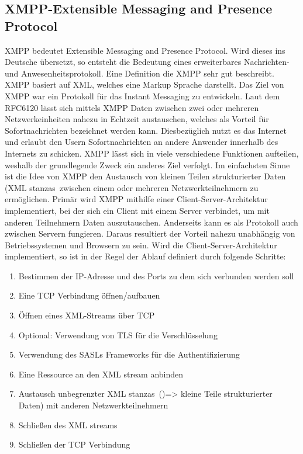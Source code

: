 \documentclass[a4paper,titlepage,halfparskip,12pt]{scrreprt}
\begin{document}
\begin{onehalfspacing}
\section{XMPP-Extensible Messaging and Presence Protocol}
\label{sec:XMPP}
\ac{XMPP} bedeutet Extensible Messaging and Presence Protocol. Wird dieses ins Deutsche übersetzt, so entsteht die Bedeutung eines erweiterbares Nachrichten- und Anwesenheitsprotokoll. Eine Definition die \ac{XMPP} sehr gut beschreibt. \ac{XMPP} basiert auf \ac{XML}, welches eine Markup Sprache darstellt. Das Ziel von \ac{XMPP} war ein Protokoll für das Instant Messaging zu entwickeln. Laut dem RFC6120 lässt sich mittels \ac{XMPP} Daten zwischen zwei oder mehreren Netzwerkeinheiten nahezu in Echtzeit austauschen, welches als Vorteil für Sofortnachrichten bezeichnet werden kann. Diesbezüglich nutzt es das Internet und erlaubt den Usern Sofortnachrichten an andere Anwender innerhalb des Internets zu schicken. \ac{XMPP} lässt sich in viele verschiedene Funktionen aufteilen, weshalb der grundlegende Zweck ein anderes Ziel verfolgt. Im einfachsten Sinne ist die Idee von \ac{XMPP} den Austausch von kleinen Teilen strukturierter Daten (\glqq \ac{XML} stanzas\grqq\ zwischen einem oder mehreren Netzwerkteilnehmern zu ermöglichen. Primär wird \ac{XMPP} mithilfe einer Client-Server-Architektur implementiert, bei der sich ein Client mit einem Server verbindet, um mit anderen Teilnehmern Daten auszutauschen. Anderseits kann es als Protokoll auch zwischen Servern fungieren. Daraus resultiert der Vorteil nahezu unabhängig von Betriebssystemen und Browsern zu sein. Wird die Client-Server-Architektur implementiert, so ist in der Regel der Ablauf definiert durch folgende Schritte: \cite{RFC6120} 
\begin{enumerate}
	\item Bestimmen der IP-Adresse und des Ports zu dem sich verbunden werden soll 
	\item Eine \ac{TCP} Verbindung öffnen/aufbauen
	\item Öffnen eines \ac{XML}-Streams über \ac{TCP}
	\item Optional: Verwendung von \ac{TLS} für die Verschlüsselung
	\item Verwendung des SASLs Frameworks für die Authentifizierung
	\item Eine Ressource an den \ac{XML} stream anbinden
	\item Austausch unbegrenzter \glqq \ac{XML} stanzas\grqq\ ()=> kleine Teile strukturierter Daten) mit anderen Netzwerkteilnehmern
	\item Schließen des \ac{XML} streams
	\item Schließen der \ac{TCP} Verbindung
\end{enumerate}


\end{onehalfspacing}
\end{document}
